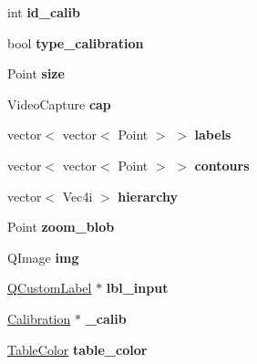 \begin{DoxyCompactItemize}
\item 
int {\bfseries id\+\_\+calib}\hypertarget{classcalibration_a574fce12317e7968bd7553fbf715ab64}{}\label{classcalibration_a574fce12317e7968bd7553fbf715ab64}

\item 
bool {\bfseries type\+\_\+calibration}\hypertarget{classcalibration_a163c467c5b9ff3c58af7b443e2672cae}{}\label{classcalibration_a163c467c5b9ff3c58af7b443e2672cae}

\item 
Point {\bfseries size}\hypertarget{classcalibration_a10327f11f7951f4282ada6c354e62522}{}\label{classcalibration_a10327f11f7951f4282ada6c354e62522}

\item 
Video\+Capture {\bfseries cap}\hypertarget{classcalibration_a4fbb8e4cac6239dc7135963c0f500105}{}\label{classcalibration_a4fbb8e4cac6239dc7135963c0f500105}

\item 
vector$<$ vector$<$ Point $>$ $>$ {\bfseries labels}\hypertarget{classcalibration_ac1a1606070bf5b667f1e7a07e3e08d1d}{}\label{classcalibration_ac1a1606070bf5b667f1e7a07e3e08d1d}

\item 
vector$<$ vector$<$ Point $>$ $>$ {\bfseries contours}\hypertarget{classcalibration_a81c7edbfe89f8f1692193bc81309a55d}{}\label{classcalibration_a81c7edbfe89f8f1692193bc81309a55d}

\item 
vector$<$ Vec4i $>$ {\bfseries hierarchy}\hypertarget{classcalibration_a818940843ae109ee2e7bd3cb202c4704}{}\label{classcalibration_a818940843ae109ee2e7bd3cb202c4704}

\item 
Point {\bfseries zoom\+\_\+blob}\hypertarget{classcalibration_af15b11ca11726a106ce3581d28ae2fe2}{}\label{classcalibration_af15b11ca11726a106ce3581d28ae2fe2}

\item 
Q\+Image {\bfseries img}\hypertarget{classcalibration_abb31447445117b52af6865628355a76a}{}\label{classcalibration_abb31447445117b52af6865628355a76a}

\item 
\hyperlink{classQCustomLabel}{Q\+Custom\+Label} $\ast$ {\bfseries lbl\+\_\+input}\hypertarget{classcalibration_ade63c6e2fc49e68c15514133f30cbc65}{}\label{classcalibration_ade63c6e2fc49e68c15514133f30cbc65}

\item 
\hyperlink{structcommon_1_1Calibration}{Calibration} $\ast$ {\bfseries \+\_\+calib}\hypertarget{classcalibration_ad523b82addd861c31202b3d0d152f848}{}\label{classcalibration_ad523b82addd861c31202b3d0d152f848}

\item 
\hyperlink{structcommon_1_1TableColor}{Table\+Color} {\bfseries table\+\_\+color}\hypertarget{classcalibration_a941d98916460576b4bb2bfe9dd7c8f85}{}\label{classcalibration_a941d98916460576b4bb2bfe9dd7c8f85}

\end{DoxyCompactItemize}


